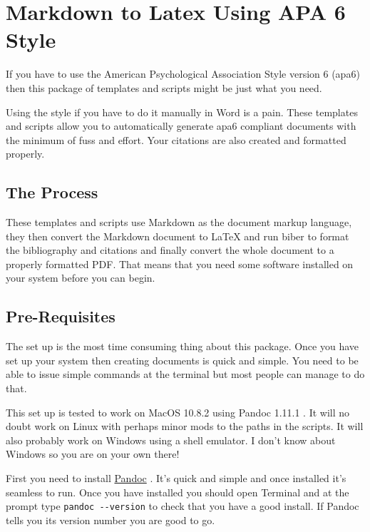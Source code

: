 \section{Markdown to Latex Using APA 6
Style}\label{markdown-to-latex-using-apa-6-style}

If you have to use the American Psychological Association Style version
6 (apa6) then this package of templates and scripts might be just what
you need.

Using the style if you have to do it manually in Word is a pain. These
templates and scripts allow you to automatically generate apa6 compliant
documents with the minimum of fuss and effort. Your citations are also
created and formatted properly.

\subsection{The Process}\label{the-process}

These templates and scripts use Markdown as the document markup
language, they then convert the Markdown document to LaTeX and run biber
to format the bibliography and citations and finally convert the whole
document to a properly formatted PDF. That means that you need some
software installed on your system before you can begin.

\subsection{Pre-Requisites}\label{pre-requisites}

The set up is the most time consuming thing about this package. Once you
have set up your system then creating documents is quick and simple. You
need to be able to issue simple commands at the terminal but most people
can manage to do that.

This set up is tested to work on MacOS 10.8.2 using Pandoc 1.11.1 . It
will no doubt work on Linux with perhaps minor mods to the paths in the
scripts. It will also probably work on Windows using a shell emulator. I
don't know about Windows so you are on your own there!

First you need to install
\href{http://johnmacfarlane.net/pandoc/installing.html}{Pandoc} . It's
quick and simple and once installed it's seamless to run. Once you have
installed you should open Terminal and at the prompt type
\texttt{pandoc -{}-version} to check that you have a good install. If
Pandoc tells you its version number you are good to go.


